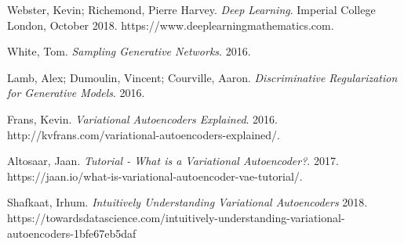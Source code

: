 \documentclass[]{article}
\begin{document}
	





\begin{thebibliography}{9}
          
  Webster, Kevin; Richemond, Pierre Harvey.
  \textit{Deep Learning}.
  Imperial College London, October 2018.
  https://www.deeplearningmathematics.com.

  White, Tom.
  \textit{Sampling Generative Networks}.
  2016.
  
  Lamb, Alex; Dumoulin, Vincent; Courville, Aaron.
  \textit{Discriminative Regularization for Generative Models}.
  2016.

  Frans, Kevin.
  \textit{Variational Autoencoders Explained}.
  2016.
  http://kvfrans.com/variational-autoencoders-explained/.

  Altosaar, Jaan.
  \textit{Tutorial - What is a Variational Autoencoder?}.
  2017.
  https://jaan.io/what-is-variational-autoencoder-vae-tutorial/.

  Shafkaat, Irhum.
  \textit{Intuitively Understanding Variational Autoencoders}
  2018.
  https://towardsdatascience.com/intuitively-understanding-variational-autoencoders-1bfe67eb5daf
  
  
\end{thebibliography}
\end{document}
